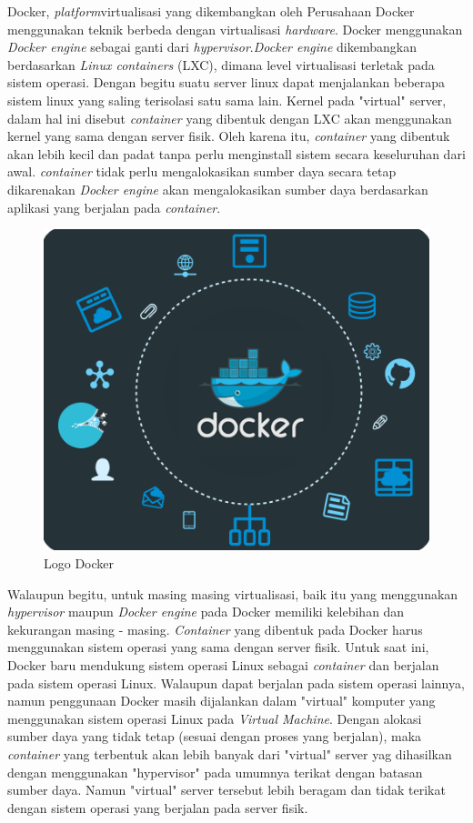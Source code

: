 Docker, \textit{platform}virtualisasi yang dikembangkan oleh Perusahaan Docker menggunakan teknik berbeda dengan virtualisasi \textit{hardware}. Docker menggunakan \textit{Docker engine} sebagai ganti dari \textit{hypervisor}.\textit{Docker engine} dikembangkan berdasarkan \textit{Linux containers} (LXC), dimana level virtualisasi terletak pada sistem operasi. Dengan begitu suatu server linux dapat menjalankan beberapa sistem linux yang saling terisolasi satu sama lain. Kernel pada "virtual" server, dalam hal ini disebut \textit{container} yang dibentuk dengan LXC akan menggunakan kernel yang sama dengan server fisik. Oleh karena itu, \textit{container} yang dibentuk akan lebih kecil dan padat tanpa perlu menginstall sistem secara keseluruhan dari awal. \textit{container} tidak perlu mengalokasikan sumber daya secara tetap dikarenakan \textit{Docker engine} akan mengalokasikan sumber daya berdasarkan aplikasi yang berjalan pada \textit{container}.
\begin{figure}
	\centering
	\includegraphics[scale=0.8]{docker.png}
	\caption{Logo Docker}
\end{figure}

Walaupun begitu, untuk masing masing virtualisasi, baik itu yang menggunakan \textit{hypervisor} maupun \textit{Docker engine} pada Docker memiliki kelebihan dan kekurangan masing - masing. \textit{Container} yang dibentuk pada Docker harus menggunakan sistem operasi yang sama dengan server fisik. Untuk saat ini, Docker baru mendukung sistem operasi Linux sebagai \textit{container} dan berjalan pada sistem operasi Linux. Walaupun dapat berjalan pada sistem operasi lainnya, namun penggunaan Docker masih dijalankan dalam "virtual" komputer yang menggunakan sistem operasi Linux pada \textit{Virtual Machine}. Dengan alokasi sumber daya yang tidak tetap (sesuai dengan proses yang berjalan), maka \textit{container} yang terbentuk akan lebih banyak dari "virtual" server yag dihasilkan dengan menggunakan "hypervisor" pada umumnya terikat dengan batasan sumber daya. Namun "virtual" server tersebut lebih beragam dan tidak terikat dengan sistem operasi yang berjalan pada server fisik.   
         